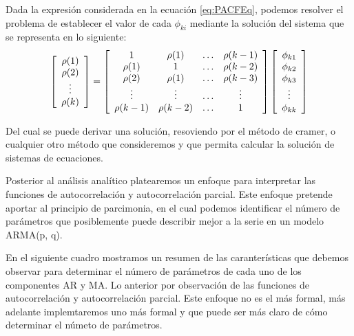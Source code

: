 \documentclass[
]{book}
\begin{document}
Dada la expresión considerada en la ecuación \eqref{eq:PACFEq}, podemos resolver el problema de establecer el valor de cada \(\phi_{ki}\) mediante la solución del sistema que se representa en lo siguiente:
\begin{equation}
    \left[ 
    \begin{array}{c}
        \rho(1) \\
        \rho(2) \\
        \vdots \\
        \rho(k)
    \end{array} 
    \right]
    = 
    \left[ 
    \begin{array}{c c c c}
        1 & \rho(1) & \ldots & \rho(k - 1)\\
        \rho(1) & 1 & \ldots & \rho(k - 2)\\
        \rho(2) & \rho(1) & \ldots & \rho(k - 3)\\
        \vdots & \vdots & \ldots & \vdots\\
        \rho(k - 1) & \rho(k - 2) & \ldots & 1\\
    \end{array} 
    \right]
    \left[ 
    \begin{array}{c}
        \phi_{k1} \\
        \phi_{k2} \\
        \phi_{k3} \\
        \vdots \\
        \phi_{kk} \\
    \end{array} 
    \right]
\end{equation}

Del cual se puede derivar una solución, resoviendo por el método de cramer, o cualquier otro método que consideremos y que permita calcular la solución de sistemas de ecuaciones.

Posterior al análisis analítico platearemos un enfoque para interpretar las funciones de autocorrelación y autocorrelación parcial. Este enfoque pretende aportar al principio de parcimonia, en el cual podemos identificar el número de parámetros que posiblemente puede describir mejor a la serie en un modelo ARMA(p, q).

En el siguiente cuadro mostramos un resumen de las caranterísticas que debemos observar para determinar el número de parámetros de cada uno de los componentes AR y MA. Lo anterior por observación de las funciones de autocorrelación y autocorrelación parcial. Este enfoque no es el más formal, más adelante implemtaremos uno más formal y que puede ser más claro de cómo determinar el númeto de parámetros.
\end{document}
